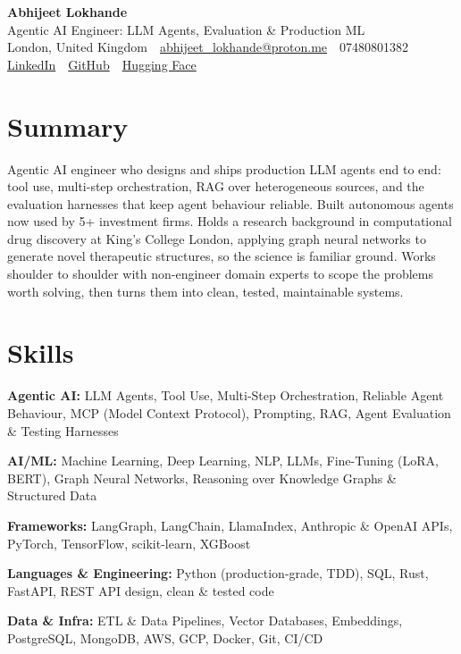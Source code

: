 \documentclass[10pt,a4paper]{article}
\newcommand{\sep}{\,\textcolor{accent!60}{\textbar}\,}
\begin{document}
\begin{center}
  {\fontsize{24}{26}\selectfont\bfseries Abhijeet Lokhande}\\[3pt]
  {\color{accent}\large Agentic AI Engineer: LLM Agents, Evaluation \& Production ML}\\[5pt]
  {\small
    London, United Kingdom \sep
    \href{mailto:abhijeet_lokhande@proton.me}{abhijeet\_lokhande@proton.me} \sep
    07480801382 \\[2pt]
    \href{https://www.linkedin.com/in/ablds/}{LinkedIn} \sep
    \href{https://github.com/abhijeetscode}{GitHub} \sep
    \href{https://huggingface.co/ab-ai}{Hugging Face}
  }
\end{center}
\vspace{2pt}

\section{Summary}
Agentic AI engineer who designs and ships production LLM agents end to end: tool use, multi-step orchestration, RAG over heterogeneous sources, and the evaluation harnesses that keep agent behaviour reliable. Built autonomous agents now used by 5+ investment firms. Holds a research background in computational drug discovery at King's College London, applying graph neural networks to generate novel therapeutic structures, so the science is familiar ground. Works shoulder to shoulder with non-engineer domain experts to scope the problems worth solving, then turns them into clean, tested, maintainable systems.

\section{Skills}
\begin{tight}
  \item[\textcolor{accent}{\small$\bullet$}] \textbf{Agentic AI:} LLM Agents, Tool Use, Multi-Step Orchestration, Reliable Agent Behaviour, MCP (Model Context Protocol), Prompting, RAG, Agent Evaluation \& Testing Harnesses
  \item[\textcolor{accent}{\small$\bullet$}] \textbf{AI/ML:} Machine Learning, Deep Learning, NLP, LLMs, Fine-Tuning (LoRA, BERT), Graph Neural Networks, Reasoning over Knowledge Graphs \& Structured Data
  \item[\textcolor{accent}{\small$\bullet$}] \textbf{Frameworks:} LangGraph, LangChain, LlamaIndex, Anthropic \& OpenAI APIs, PyTorch, TensorFlow, scikit-learn, XGBoost
  \item[\textcolor{accent}{\small$\bullet$}] \textbf{Languages \& Engineering:} Python (production-grade, TDD), SQL, Rust, FastAPI, REST API design, clean \& tested code
  \item[\textcolor{accent}{\small$\bullet$}] \textbf{Data \& Infra:} ETL \& Data Pipelines, Vector Databases, Embeddings, PostgreSQL, MongoDB, AWS, GCP, Docker, Git, CI/CD
\end{tight}
\end{document}
